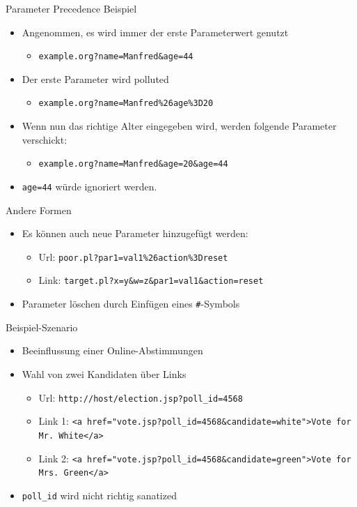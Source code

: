 \documentclass[t,german,aspectratio=169]{beamer}
\begin{document}
\begin{frame}{Parameter Precedence Beispiel}
\begin{itemize}[<+->]
	\item Angenommen, es wird immer der erste Parameterwert genutzt
	\begin{itemize}
		\item[] \texttt{example.org?name=Manfred\&{}age=44}
	\end{itemize}
	\item Der erste Parameter wird \glqq polluted\grqq{}
	\begin{itemize}
		\item[] \texttt{example.org?name=Manfred\%26age\%3D20}
	\end{itemize}
	\item Wenn nun das richtige Alter eingegeben wird, werden folgende Parameter verschickt:
	\begin{itemize}
		\item[] \texttt{example.org?name=Manfred\&{}age=20\&{}age=44}
	\end{itemize}
	\item \texttt{age=44} würde ignoriert werden.
\end{itemize}
\end{frame}

\begin{frame}{Andere Formen}
\begin{itemize}%
	\item Es können auch neue Parameter hinzugefügt werden:
	\begin{itemize} 
		\item Url: \texttt{poor.pl?par1=val1\textcolor{red!70!black}{\%26action\%3Dreset}}
		\item Link: \texttt{target.pl?x=y\&w=z\&par1=val1\textcolor{red!70!black}{\&action=reset}}
	\end{itemize}
	\item Parameter löschen durch Einfügen eines \texttt{\#}-Symbols
\end{itemize}
\end{frame}

\begin{frame}{Beispiel-Szenario}
\begin{itemize}%
	\item Beeinflussung einer Online-Abstimmungen
	\item Wahl von zwei Kandidaten über Links
	\begin{itemize}
		\item Url: \texttt{http://host/election.jsp?\textcolor{red!70!black}{poll\_id=4568}}
		\item Link 1: \texttt{<a href="vote.jsp?\textcolor{red!70!black}{poll\_id=4568}\&\textcolor{blue!70!black}{candidate=white}">Vote for Mr. White</a>}
		\item Link 2: \texttt{<a href="vote.jsp?\textcolor{red!70!black}{poll\_id=4568}\&\textcolor{blue!70!black}{candidate=green}">Vote for Mrs. Green</a>}
	\end{itemize}
	\item \texttt{poll\_id} wird nicht richtig sanatized
\end{itemize}
\end{frame}
\end{document}
